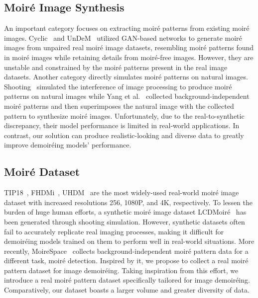 \subsection{Moiré Image Synthesis}
An important category focuses on extracting moiré patterns from existing moiré images. Cyclic~\cite{cyclic} and UnDeM~\cite{undem} utilized GAN-based networks to generate moiré images from unpaired real moiré image datasets, resembling moiré patterns found in moiré images while retaining details from moiré-free images. However, they are unstable and constrained by the moiré patterns present in the real image datasets. 
Another category directly simulates moiré patterns on natural images. Shooting~\cite{shooting} simulated the interference of image processing to produce moiré patterns on natural images while Yang et al.~ collected background-independent moiré patterns and then superimposes the natural image with the collected pattern to synthesize moiré images. 
Unfortunately, due to the real-to-synthetic discrepancy, their model performance is limited in real-world applications. 
In contrast, our solution can produce realistic-looking and diverse data to greatly improve demoiréing models' performance.

\subsection{Moiré Dataset} 
TIP18~\cite{sun2018moire}, FHDMi~\cite{he2020fhde}, UHDM~\cite{yu2022towards} are the most widely-used real-world moiré image dataset with increased resolutions 256, 1080P, and 4K, respectively. To lessen the burden of huge human efforts, a synthetic moiré image dataset LCDMoiré~ has been generated through shooting simulation.
However, synthetic datasets often fail to accurately replicate real imaging processes, making it difficult for demoiréing models trained on them to perform well in real-world situations.
More recently, MoireSpace~\cite{yang2023doing} collects background-independent moiré pattern data for a different task, moiré detection. Inspired by it, we propose to collect a real moiré pattern dataset for image demoiréing. Taking inspiration from this effort, we introduce a real moiré pattern dataset specifically tailored for image demoiréing. Comparatively, our dataset boasts a larger volume and greater diversity of data.


